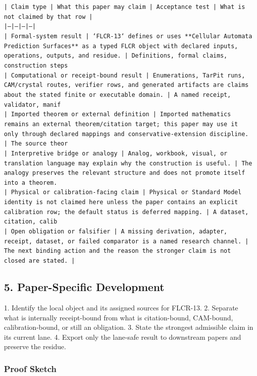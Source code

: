 \documentclass[11pt]{article}
\begin{document}
\noindent\texttt{| Claim type | What this paper may claim | Acceptance test | What is not claimed by that row |}\\
\noindent\texttt{|---|---|---|---|}\\
\noindent\texttt{| Formal-system result | `FLCR-13` defines or uses **Cellular Automata Prediction Surfaces** as a typed FLCR object with declared inputs, operations, outputs, and residue. | Definitions, formal claims, construction steps}\\
\noindent\texttt{| Computational or receipt-bound result | Enumerations, TarPit runs, CAM/crystal routes, verifier rows, and generated artifacts are claims about the stated finite or executable domain. | A named receipt, validator, manif}\\
\noindent\texttt{| Imported theorem or external definition | Imported mathematics remains an external theorem/citation target; this paper may use it only through declared mappings and conservative-extension discipline. | The source theor}\\
\noindent\texttt{| Interpretive bridge or analogy | Analog, workbook, visual, or translation language may explain why the construction is useful. | The analogy preserves the relevant structure and does not promote itself into a theorem. }\\
\noindent\texttt{| Physical or calibration-facing claim | Physical or Standard Model identity is not claimed here unless the paper contains an explicit calibration row; the default status is deferred mapping. | A dataset, citation, calib}\\
\noindent\texttt{| Open obligation or falsifier | A missing derivation, adapter, receipt, dataset, or failed comparator is a named research channel. | The next binding action and the reason the stronger claim is not closed are stated. | }\\

\subsection*{5. Paper-Specific Development}

1. Identify the local object and its assigned sources for FLCR-13.
2. Separate what is internally receipt-bound from what is citation-bound, CAM-bound, calibration-bound, or still an obligation.
3. State the strongest admissible claim in its current lane.
4. Export only the lane-safe result to downstream papers and preserve the residue.

\subsubsection*{Proof Sketch}
\end{document}

